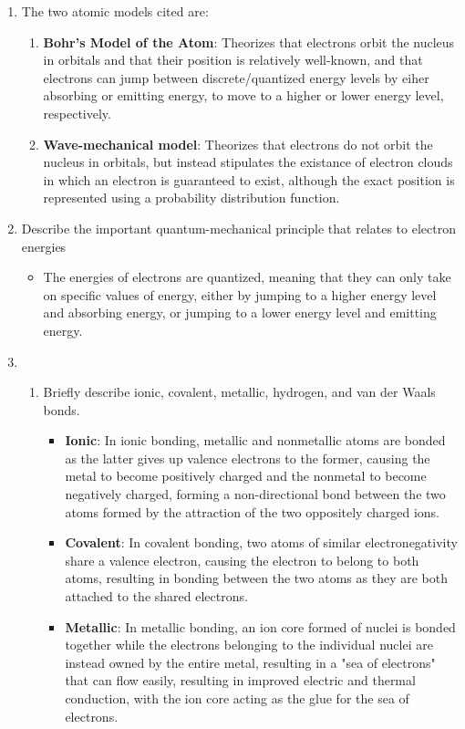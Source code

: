 \documentclass{article}
\begin{document}
\begin{enumerate}
    \item The two atomic models cited are:
    \begin{enumerate}
        \item \textbf{Bohr's Model of the Atom}: Theorizes that electrons orbit the nucleus in orbitals and that their position is relatively well-known, and that electrons can jump between discrete/quantized energy levels by eiher absorbing or emitting energy, to move to a higher or lower energy level, respectively.
        \item \textbf{Wave-mechanical model}: Theorizes that electrons do not orbit the nucleus in orbitals, but instead stipulates the existance of electron clouds in which an electron is guaranteed to exist, although the exact position is represented using a probability distribution function.
    \end{enumerate}
    \item Describe the important quantum-mechanical principle that relates to electron energies
    \begin{itemize}
        \item The energies of electrons are quantized, meaning that they can only take on specific values of energy, either by jumping to a higher energy level and absorbing energy, or jumping to a lower energy level and emitting energy.
    \end{itemize}
    \item \begin{enumerate}
        \item Briefly describe ionic, covalent, metallic, hydrogen, and van der Waals bonds.
        \begin{itemize}
            \item \textbf{Ionic}: In ionic bonding, metallic and nonmetallic atoms are bonded as the latter gives up valence electrons to the former, causing the metal to become positively charged and the nonmetal to become negatively charged, forming a non-directional bond between the two atoms formed by the attraction of the two oppositely charged ions.
            \item \textbf{Covalent}: In covalent bonding, two atoms of similar electronegativity share a valence electron, causing the electron to belong to both atoms, resulting in bonding between the two atoms as they are both attached to the shared electrons.
            \item \textbf{Metallic}: In metallic bonding, an ion core formed of nuclei is bonded together while the electrons belonging to the individual nuclei are instead owned by the entire metal, resulting in a "sea of electrons" that can flow easily, resulting in improved electric and thermal conduction, with the ion core acting as the glue for the sea of electrons.

\end{itemize}
\end{enumerate}
\end{enumerate}
\end{document}
